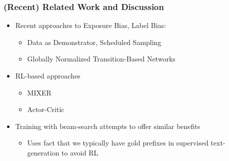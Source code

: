 \documentclass{beamer}
\newcommand{\air}{\vspace{0.25cm}}
\let\realcitep\citep
\renewcommand*{\citep}[1]{{\footnotesize \realcitep{#1}}}
\begin{document}
 \begin{frame}
   \frametitle{(Recent) Related Work and Discussion}
   \begin{itemize}
   \item Recent approaches to Exposure Bias, Label Bias:
  \begin{itemize}
  \item Data as Demonstrator, Scheduled Sampling \citep{Venkatraman,bengio15scheduled}
  \item Globally Normalized Transition-Based Networks \citep{Andor2016}
  \end{itemize}
  \air
  \item RL-based approaches
  \begin{itemize}
  \item MIXER \citep{ranzato16sequence}
  \item Actor-Critic \citep{Bahdanau2016}
  \end{itemize}
  \air
  \item Training with beam-search attempts to offer similar benefits
  \begin{itemize}
  \item Uses fact that we typically have gold prefixes in supervised text-generation to avoid RL
\end{itemize}   
\end{itemize}

 \end{frame}
\end{document}
